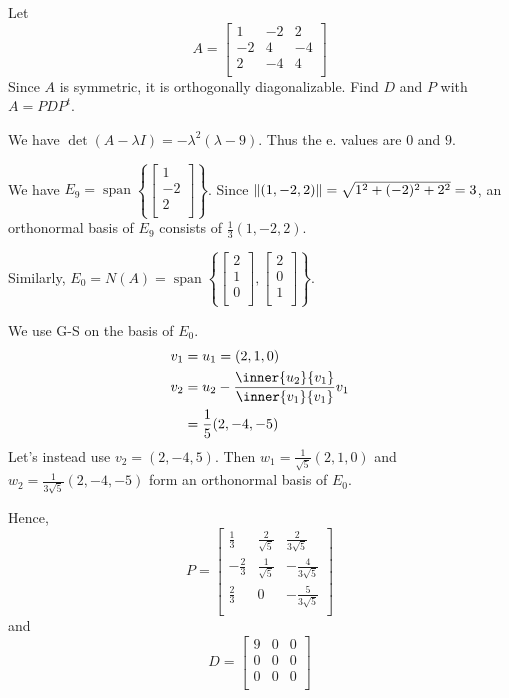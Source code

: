 \documentclass{article}
\DeclareMathOperator{\spn}{span}
\begin{document}
    \begin{example}
      Let \[
        A =
        \begin{bmatrix}
          1 & -2 & 2\\
          -2 & 4 & -4\\
          2 & -4 & 4\\
        \end{bmatrix}
      \]
      Since $A$ is symmetric, it is orthogonally diagonalizable. Find $D$ and $P$ with $A = PDP^t$.

      We have $\det (A - \lambda I) = -\lambda^2(\lambda-9)$. Thus the e. values are $0$ and $9$.

      We have $E_9 = \spn \left\{
        \begin{bmatrix}
          1\\-2\\2\\
      \end{bmatrix}\right\}$. Since $\norm{(1, -2, 2)} = \sqrt{1^2 + (-2)^2 + 2^2} = 3$, an orthonormal basis of $E_9$ consists of $\frac{1}{3}(1, -2, 2)$.

      Similarly, $E_0 = N(A) = \spn \left\{
        \begin{bmatrix}
          2\\1\\0\\
        \end{bmatrix},
        \begin{bmatrix}
          2\\0\\1\\
      \end{bmatrix}\right\}$.

      We use G-S on the basis of $E_0$.
      \begin{align*}
        v_1 &= u_1 = (2, 1, 0)\\
        v_2 &= u_2 - \frac{\inner{u_2}{v_1}}{\inner{v_1}{v_1}}v_1\\
        &= \frac{1}{5}(2, -4, -5)
      \end{align*}
      Let's instead use $v_2 = (2, -4, 5)$. Then $w_1 = \frac{1}{\sqrt{5}}(2, 1, 0)$ and $w_2 = \frac{1}{3\sqrt{5}}(2, -4, -5)$ form an orthonormal basis of $E_0$.

      Hence,
      \[
        P =
        \begin{bmatrix}
          \frac{1}{3} & \frac{2}{\sqrt{5}} & \frac{2}{3\sqrt{5}}\\
          -\frac{2}{3} & \frac{1}{\sqrt{5}} & -\frac{4}{3\sqrt{5}}\\
          \frac{2}{3} & 0 & -\frac{5}{3\sqrt{5}}\\
        \end{bmatrix}
      \] and \[
        D =
        \begin{bmatrix}
          9&0&0\\
          0&0&0\\
          0&0&0\\
        \end{bmatrix}
      \]
    \end{example}
\end{document}
